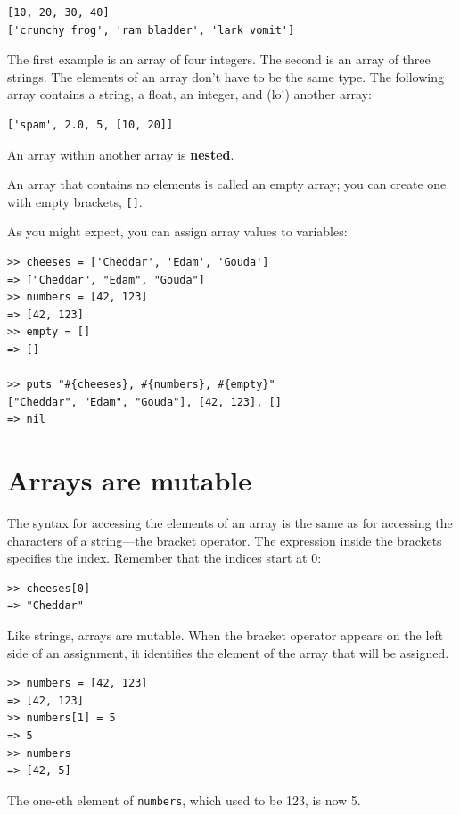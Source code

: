 \documentclass[10pt]{book}
\begin{document}
\begin{verbatim}
[10, 20, 30, 40]
['crunchy frog', 'ram bladder', 'lark vomit']
\end{verbatim}
%
The first example is an array of four integers.  The second is an array of
three strings.  The elements of an array don't have to be the same type.
The following array contains a string, a float, an integer, and
(lo!) another array:

\begin{verbatim}
['spam', 2.0, 5, [10, 20]]
\end{verbatim}
%
An array within another array is {\bf nested}.

An array that contains no elements is
called an empty array; you can create one with empty
brackets, \verb"[]".

As you might expect, you can assign array values to variables:

\begin{verbatim}
>> cheeses = ['Cheddar', 'Edam', 'Gouda']
=> ["Cheddar", "Edam", "Gouda"]
>> numbers = [42, 123]
=> [42, 123]
>> empty = []
=> []

>> puts "#{cheeses}, #{numbers}, #{empty}"
["Cheddar", "Edam", "Gouda"], [42, 123], []
=> nil
\end{verbatim}
%


\section{Arrays are mutable}
\label{mutable}

The syntax for accessing the elements of an array is the same as for
accessing the characters of a string---the bracket operator.  The
expression inside the brackets specifies the index.  Remember that the
indices start at 0:

\begin{verbatim}
>> cheeses[0]
=> "Cheddar"
\end{verbatim}
%
Like strings, arrays are mutable.  When the bracket operator appears
on the left side of an assignment, it identifies the element of the
array that will be assigned.

\begin{verbatim}
>> numbers = [42, 123]
=> [42, 123]
>> numbers[1] = 5
=> 5
>> numbers
=> [42, 5]
\end{verbatim}
%
The one-eth element of {\tt numbers}, which
used to be 123, is now 5.
\end{document}
